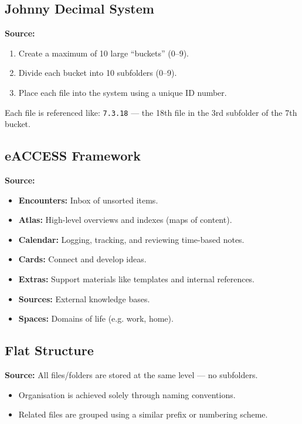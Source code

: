 \subsection*{Johnny Decimal System}
\textbf{Source:} \cite{SystemOrganiseYour2025}
\begin{enumerate}
  \item Create a maximum of 10 large “buckets” (0–9).
  \item Divide each bucket into 10 subfolders (0–9).
  \item Place each file into the system using a unique ID number.
\end{enumerate}

Each file is referenced like: \texttt{7.3.18} — the 18th file in the 3rd subfolder of the 7th bucket.


\subsection*{eACCESS Framework}
\textbf{Source:} \cite{Lession5Why}

\begin{itemize}
  \item \textbf{Encounters:} Inbox of unsorted items.
  \item \textbf{Atlas:} High-level overviews and indexes (maps of content).
  \item \textbf{Calendar:} Logging, tracking, and reviewing time-based notes.
  \item \textbf{Cards:} Connect and develop ideas.
  \item \textbf{Extras:} Support materials like templates and internal references.
  \item \textbf{Sources:} External knowledge bases.
  \item \textbf{Spaces:} Domains of life (e.g. work, home).
\end{itemize}


\subsection*{Flat Structure}
\textbf{Source:} \cite{staffFlatFileSystem}
All files/folders are stored at the same level — no subfolders.

\begin{itemize}
  \item Organisation is achieved solely through naming conventions.
  \item Related files are grouped using a similar prefix or numbering scheme.
\end{itemize}


